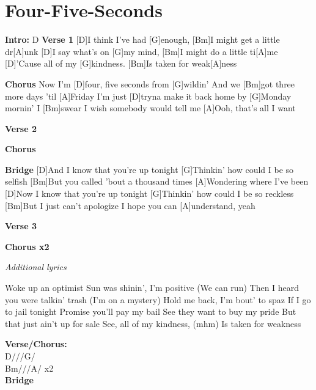 \documentclass{article}
\begin{document}
\section{Four-Five-Seconds}

\begin{guitar}
\begin{multicols}{2}


\textbf{Intro:} D
\textbf{Verse 1}
[D]I think I've had [G]enough, 
[Bm]I might get a little dr[A]unk
[D]I say what's on [G]my mind,
[Bm]I might do a little ti[A]me
[D]'Cause all of my [G]kindness. 
[Bm]Is taken for weak[A]ness

\textbf{Chorus}
Now I'm [D]four, five seconds from [G]wildin'
And we [Bm]got three more days 'til [A]Friday
I'm just [D]tryna make it back home by [G]Monday mornin'
I [Bm]swear I wish somebody would tell me
[A]Ooh, that's all I want

\textbf{Verse 2}

\textbf{Chorus}

\textbf{Bridge}
[D]And I know that you're up tonight
[G]Thinkin' how could I be so selfish
[Bm]But you called 'bout a thousand times
[A]Wondering where I've been
[D]Now I know that you're up tonight
[G]Thinkin' how could I be so reckless
[Bm]But I just can't apologize
I hope you can [A]understand, yeah

\textbf{Verse 3}

\textbf{Chorus x2}


\end{multicols}

\begin{center}
\textit{Additional lyrics}
\end{center}

\begin{multicols}{2}\begin{flushleft}
Woke up an optimist
Sun was shinin', I'm positive (We can run)
Then I heard you were talkin' trash (I'm on a mystery)
Hold me back, I'm bout' to spaz
\columnbreak
If I go to jail tonight
Promise you'll pay my bail
See they want to buy my pride
But that just ain't up for sale
See, all of my kindness, (mhm)
Is taken for weakness

\end{flushleft}
\end{multicols}
\end{guitar}

\textbf{Verse/Chorus:}\\
D///G/\\
Bm///A/ x2\\
\textbf{Bridge}\\
\end{document}
